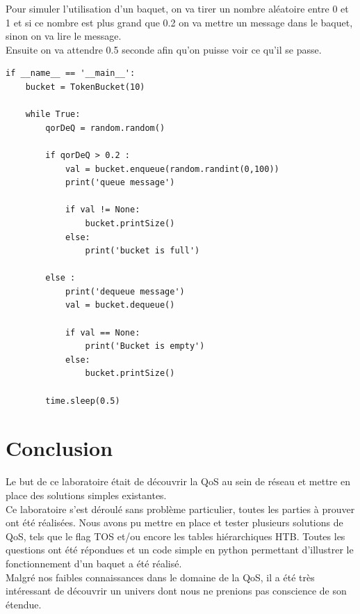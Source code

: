 \documentclass{article}
\begin{document}
Pour simuler l'utilisation d'un baquet, on va tirer un nombre aléatoire entre 0 et 1 et si ce nombre est plus grand que 0.2 on va mettre un message dans le baquet, sinon on va lire le message.\\

Ensuite on va attendre 0.5 seconde afin qu'on puisse voir ce qu'il se passe.

\begin{lstlisting}
if __name__ == '__main__':
	bucket = TokenBucket(10)
	
	while True:
		qorDeQ = random.random()
		
		if qorDeQ > 0.2 :
			val = bucket.enqueue(random.randint(0,100))
			print('queue message')
			
			if val != None:
				bucket.printSize()
			else:
				print('bucket is full')
		
		else :
			print('dequeue message')
			val = bucket.dequeue()
		
			if val == None:
				print('Bucket is empty')
			else:
				bucket.printSize()
	
		time.sleep(0.5)
\end{lstlisting}

\section{Conclusion}
Le but de ce laboratoire était de découvrir la QoS au sein de réseau et mettre en place des solutions simples existantes.
\\

Ce laboratoire s'est déroulé sans problème particulier, toutes les parties à prouver ont été réalisées. Nous avons pu mettre en place et tester plusieurs solutions de QoS, tels que le flag TOS et/ou encore les tables hiérarchiques HTB. Toutes les questions ont été répondues et un code simple en python permettant d'illustrer le fonctionnement d'un baquet a été réalisé.
\\

Malgré nos faibles connaissances dans le domaine de la QoS, il a été très intéressant de découvrir un univers dont nous ne prenions pas conscience de son étendue.

\printbibliography
\end{document}
